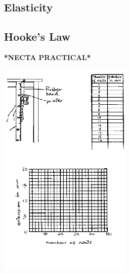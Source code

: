 \begin{multicols}{2}

\section*{Elasticity}


\subsection{Hooke's Law}
\textbf{*NECTA PRACTICAL*}
\begin{center}
\includegraphics[width=0.49\textwidth]{./img/source/meas-mass.png}
\end{center}


\end{multicols}
